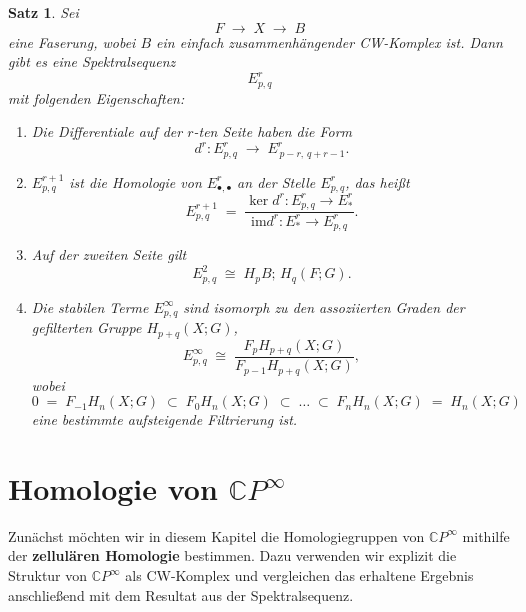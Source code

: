 \documentclass[12pt]{article}
\numberwithin{conj}{section}
\newtheorem{theorem}[conj]{Satz}
\begin{document}
    \begin{theorem}
        {\cite[Proposition 4E.1]{hatcher2001}} \label{SerreSpectralSequence} Sei
        \[
            F \;\longrightarrow\; X \;\longrightarrow\; B
        \]
        eine Faserung, wobei $B$ ein einfach zusammenhängender CW-Komplex ist. Dann gibt
        es eine Spektralsequenz
        \[
            E^{r}_{p,q}
        \]
        mit folgenden Eigenschaften:
        \begin{enumerate}[label=(\alph{*})]
            \item Die Differentiale auf der $r$-ten Seite haben die Form
                \[
                    d^{r} : E^{r}_{p,q}\;\longrightarrow\; E^{r}_{\,p-r,\,q+r-1}.
                \]

            \item $E^{r+1}_{p,q}$ ist die Homologie von $E^{r}_{\bullet,\bullet}$ an der
                Stelle $E^{r}_{p,q}$, das heißt
                \[
                    E^{r+1}_{p,q}\;=\; \frac{\ker d^{r} : E^{r}_{p,q}\to E^{r}_{\!*} }{\mathrm{im} d^{r}
                    : E^{r}_{\!*}\to E^{r}_{p,q} }.
                \]

            \item Auf der zweiten Seite gilt
                \[
                    E^{2}_{p,q}\;\cong\; H_{p} B;\,H_{q}(F;G) .
                \]

            \item Die stabilen Terme $E^{\infty}_{p,q}$ sind isomorph zu den assoziierten
                Graden der gefilterten Gruppe $H_{p+q}(X;G)$,
                \[
                    E^{\infty}_{p,q}\;\cong\; \frac{F_{p}H_{p+q}(X;G)}{F_{p-1}H_{p+q}(X;G)}
                    ,
                \]
                wobei
                \[
                    0 \;=\; F_{-1}H_{n}(X;G) \;\subset\; F_{0}H_{n}(X;G) \;\subset\; \dots
                    \;\subset\; F_{n}H_{n}(X;G) \;=\; H_{n}(X;G)
                \]
                eine bestimmte aufsteigende Filtrierung ist.
        \end{enumerate}
    \end{theorem}

    \section{Homologie von $\mathbb{C}P^{\infty}$}
    \noindent
    Zunächst möchten wir in diesem Kapitel die Homologiegruppen von $\mathbb{C}P^{\infty}$
    mithilfe der \textbf{zellulären Homologie} bestimmen. Dazu verwenden wir explizit
    die Struktur von $\mathbb{C}P^{\infty}$ als CW-Komplex und vergleichen das erhaltene
    Ergebnis anschließend mit dem Resultat aus der Spektralsequenz.
\end{document}
